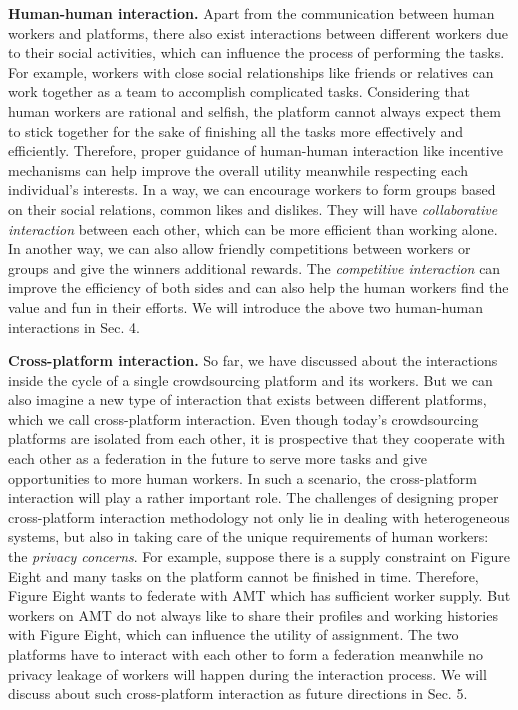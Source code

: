 \documentclass[11pt]{article}
\newcommand{\fakeparagraph}[1]{\vspace{1mm}\noindent\textbf{#1.}}
\begin{document}
\fakeparagraph{Human-human interaction}
Apart from the communication between human workers and platforms, there also exist interactions between different workers due to their social activities, which can influence the process of performing the tasks. 
For example, workers with close social relationships like friends or relatives can work together as a team to accomplish complicated tasks.
Considering that human workers are rational and selfish, the platform cannot always expect them to stick together for the sake of finishing all the tasks more effectively and efficiently.
Therefore, proper guidance of human-human interaction like incentive mechanisms can help improve the overall utility meanwhile respecting each individual's interests.
In a way, we can encourage workers to form groups based on their social relations, common likes and dislikes.
They will have \textit{collaborative interaction} between each other, which can be more efficient than working alone.
In another way, we can also allow friendly competitions between workers or groups and give the winners additional rewards.
The \textit{competitive interaction} can improve the efficiency of both sides and can also help the human workers find the value and fun in their efforts.
We will introduce the above two human-human interactions in Sec. 4. 

\fakeparagraph{Cross-platform interaction}
So far, we have discussed about the interactions inside the cycle of a single crowdsourcing platform and its workers. 
But we can also imagine a new type of interaction that exists between different platforms, which we call cross-platform interaction.
Even though today's crowdsourcing platforms are isolated from each other, it is prospective that they cooperate with each other as a federation in the future to serve more tasks and give opportunities to more human workers.
In such a scenario, the cross-platform interaction will play a rather important role.
The challenges of designing proper cross-platform interaction methodology not only lie in dealing with heterogeneous systems, but also in taking care of the unique requirements of human workers: the \textit{privacy concerns}. 
For example, suppose there is a supply constraint on Figure Eight and many tasks on the platform cannot be finished in time. Therefore, Figure Eight wants to federate with AMT which has sufficient worker supply. 
But workers on AMT do not always like to share their profiles and working histories with Figure Eight, which can influence the utility of assignment.  
The two platforms have to interact with each other to form a federation meanwhile no privacy leakage of workers will happen during the interaction process.
We will discuss about such cross-platform interaction as future directions in Sec. 5.
\end{document}
